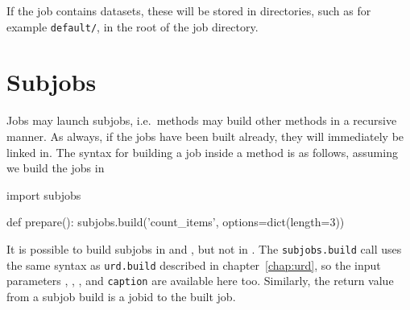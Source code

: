 If the job contains datasets, these will be stored in directories,
such as for example \texttt{default/}, in the root of the job
directory.



\section{Subjobs}

Jobs may launch subjobs, i.e.\ methods may build other methods in a
recursive manner.  As always, if the jobs have been built already,
they will immediately be linked in.  The syntax for building a job
inside a method is as follows, assuming we build the jobs in \prepare
\begin{python}
import subjobs

def prepare():
    subjobs.build('count_items', options=dict(length=3))
\end{python}
It is possible to build subjobs in \prepare and \synthesis, but not in
\analysis.    The \texttt{subjobs.build} call uses the
same syntax as \texttt{urd.build} described in chapter~\ref{chap:urd}, so
the input parameters \options, \datasets, \jobids, and
\texttt{caption} are available here too.  Similarly, the return value
from a subjob build is a jobid to the built job.

